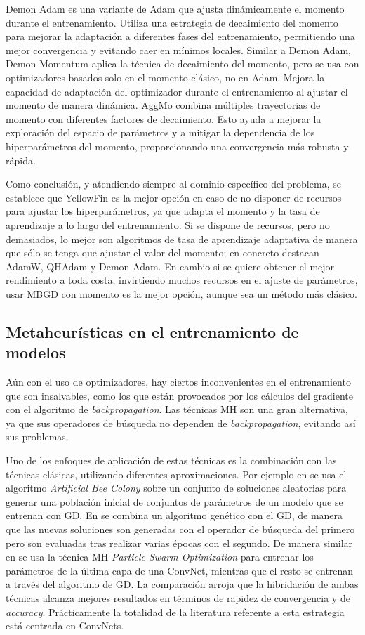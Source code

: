 Demon Adam es una variante de Adam que ajusta dinámicamente el momento durante el entrenamiento. Utiliza una estrategia de decaimiento del momento para mejorar la adaptación a diferentes fases del entrenamiento, permitiendo una mejor convergencia y evitando caer en mínimos locales. Similar a Demon Adam, Demon Momentum aplica la técnica de decaimiento del momento, pero se usa con optimizadores basados solo en el momento clásico, no en Adam. Mejora la capacidad de adaptación del optimizador durante el entrenamiento al ajustar el momento de manera dinámica. AggMo combina múltiples trayectorias de momento con diferentes factores de decaimiento. Esto ayuda a mejorar la exploración del espacio de parámetros y a mitigar la dependencia de los hiperparámetros del momento, proporcionando una convergencia más robusta y rápida.


Como conclusión, y atendiendo siempre al dominio específico del problema, se establece que YellowFin es la mejor opción en caso de no disponer de recursos para ajustar los hiperparámetros, ya que adapta el momento y la tasa de aprendizaje a lo largo del entrenamiento. Si se dispone de recursos, pero no demasiados, lo mejor son algoritmos de tasa de aprendizaje adaptativa de manera que sólo se tenga que ajustar el valor del momento; en concreto destacan AdamW, QHAdam y Demon Adam. En cambio si se quiere obtener el mejor rendimiento a toda costa, invirtiendo muchos recursos en el ajuste de parámetros, usar MBGD con momento es la mejor opción, aunque sea un método más clásico.


\subsection{Metaheurísticas en el entrenamiento de modelos}

Aún con el uso de optimizadores, hay ciertos inconvenientes en el entrenamiento que son insalvables, como los que están provocados por los cálculos del gradiente con el algoritmo de \textit{backpropagation}. Las técnicas MH son una gran alternativa, ya que sus operadores de búsqueda no dependen de \textit{backpropagation}, evitando así sus problemas. 

Uno de los enfoques de aplicación de estas técnicas es la combinación con las técnicas clásicas, utilizando diferentes aproximaciones. Por ejemplo en \cite{162} se usa el algoritmo \textit{Artificial Bee Colony} \cite{beesalgo} sobre un conjunto de soluciones aleatorias para generar una población inicial de conjuntos de parámetros de un modelo que se entrenan con GD. En \cite{155} se combina un algoritmo genético con el GD, de manera que las nuevas soluciones son generadas con el operador de búsqueda del primero pero son evaluadas tras realizar varias épocas con el segundo. De manera similar en \cite{163} se usa la técnica MH \textit{Particle Swarm Optimization} \cite{pso} para entrenar los parámetros de la última capa de una ConvNet, mientras que el resto se entrenan a través del algoritmo de GD. La comparación arroja que la hibridación de ambas técnicas alcanza mejores resultados en términos de rapidez de convergencia y de \textit{accuracy}. Prácticamente la totalidad de la literatura referente a esta estrategia está centrada en ConvNets.

